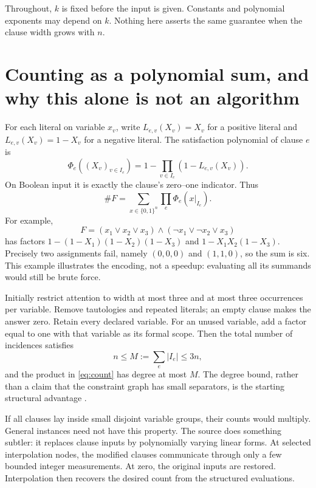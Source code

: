 \documentclass[11pt,a4paper]{article}
\numberwithin{equation}{section}
\theoremstyle{definition}
\theoremstyle{remark}
\begin{document}
Throughout, $k$ is fixed before the input is given. Constants and polynomial
exponents may depend on $k$. Nothing here asserts the same guarantee when the
clause width grows with $n$.

\section{Counting as a polynomial sum, and why this alone is not an algorithm}
\label{sec:encoding}
For each literal on variable $x_v$, write $L_{e,v}(X_v)=X_v$ for a positive
literal and $L_{e,v}(X_v)=1-X_v$ for a negative literal. The satisfaction
polynomial of clause $e$ is
\[
 \Phi_e((X_v)_{v\in I_e})
       =1-\prod_{v\in I_e}(1-L_{e,v}(X_v)).
\]
On Boolean input it is exactly the clause's zero--one indicator. Thus
\begin{equation}\label{eq:count}
 \#F=\sum_{x\in\{0,1\}^n}\prod_e\Phi_e(x|_{I_e}).
\end{equation}
For example,
\[
 F=(x_1\vee x_2\vee x_3)\wedge(\neg x_1\vee\neg x_2\vee x_3)
\]
has factors $1-(1-X_1)(1-X_2)(1-X_3)$ and
$1-X_1X_2(1-X_3)$. Precisely two assignments fail, namely $(0,0,0)$ and
$(1,1,0)$, so the sum is six. This example illustrates the encoding, not a
speedup: evaluating all its summands would still be brute force.

Initially restrict attention to width at most three and at most three
occurrences per variable. Remove tautologies and repeated literals; an empty
clause makes the answer zero. Retain every declared variable. For an unused
variable, add a factor equal to one with that variable as its formal scope.
Then the total number of incidences satisfies
\[
 n\le M:=\sum_e|I_e|\le3n,
\]
and the product in \eqref{eq:count} has degree at most $M$.
The degree bound, rather than a claim that the constraint graph has small
separators, is the starting structural advantage \cite{paper}.

If all clauses lay inside small disjoint variable groups, their counts would
multiply. General instances need not have this property. The source does
something subtler: it replaces clause inputs by polynomially varying linear
forms. At selected interpolation nodes, the modified clauses communicate
through only a few bounded integer measurements. At zero, the original
inputs are restored. Interpolation then recovers the desired count from the
structured evaluations.
\end{document}
